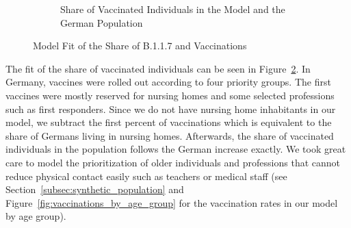 \begin{figure}[ht]
\begin{subfigure}[b]{0.425\textwidth}
    \caption{Share of Vaccinated Individuals in the Model and the German Population}
    \label{fig:fit_vaccinations}
  \end{subfigure}
  \caption{Model Fit of the Share of B.1.1.7 and Vaccinations}
\end{figure}

The fit of the share of vaccinated individuals can be seen in
Figure~\ref{fig:fit_vaccinations}. In Germany, vaccines were rolled out according to four
priority groups. The first vaccines were mostly reserved for nursing homes and some
selected professions such as first responders. Since we do not have nursing home
inhabitants in our model, we subtract the first percent of vaccinations which is
equivalent to the share of Germans living in nursing homes. Afterwards, the share of
vaccinated individuals in the population follows the German increase exactly. We took
great care to model the prioritization of older individuals and professions that cannot
reduce physical contact easily such as teachers or medical staff (see
Section~\ref{subsec:synthetic_population} and Figure~\ref{fig:vaccinations_by_age_group}
for the vaccination rates in our model by age group).

\FloatBarrier

